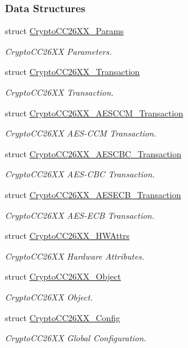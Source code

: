 \subsubsection*{Data Structures}
\begin{DoxyCompactItemize}
\item 
struct \hyperlink{struct_crypto_c_c26_x_x___params}{Crypto\+C\+C26\+X\+X\+\_\+\+Params}
\begin{DoxyCompactList}\small\item\em Crypto\+C\+C26\+X\+X Parameters. \end{DoxyCompactList}\item 
struct \hyperlink{struct_crypto_c_c26_x_x___transaction}{Crypto\+C\+C26\+X\+X\+\_\+\+Transaction}
\begin{DoxyCompactList}\small\item\em Crypto\+C\+C26\+X\+X Transaction. \end{DoxyCompactList}\item 
struct \hyperlink{struct_crypto_c_c26_x_x___a_e_s_c_c_m___transaction}{Crypto\+C\+C26\+X\+X\+\_\+\+A\+E\+S\+C\+C\+M\+\_\+\+Transaction}
\begin{DoxyCompactList}\small\item\em Crypto\+C\+C26\+X\+X A\+E\+S-\/\+C\+C\+M Transaction. \end{DoxyCompactList}\item 
struct \hyperlink{struct_crypto_c_c26_x_x___a_e_s_c_b_c___transaction}{Crypto\+C\+C26\+X\+X\+\_\+\+A\+E\+S\+C\+B\+C\+\_\+\+Transaction}
\begin{DoxyCompactList}\small\item\em Crypto\+C\+C26\+X\+X A\+E\+S-\/\+C\+B\+C Transaction. \end{DoxyCompactList}\item 
struct \hyperlink{struct_crypto_c_c26_x_x___a_e_s_e_c_b___transaction}{Crypto\+C\+C26\+X\+X\+\_\+\+A\+E\+S\+E\+C\+B\+\_\+\+Transaction}
\begin{DoxyCompactList}\small\item\em Crypto\+C\+C26\+X\+X A\+E\+S-\/\+E\+C\+B Transaction. \end{DoxyCompactList}\item 
struct \hyperlink{struct_crypto_c_c26_x_x___h_w_attrs}{Crypto\+C\+C26\+X\+X\+\_\+\+H\+W\+Attrs}
\begin{DoxyCompactList}\small\item\em Crypto\+C\+C26\+X\+X Hardware Attributes. \end{DoxyCompactList}\item 
struct \hyperlink{struct_crypto_c_c26_x_x___object}{Crypto\+C\+C26\+X\+X\+\_\+\+Object}
\begin{DoxyCompactList}\small\item\em Crypto\+C\+C26\+X\+X Object. \end{DoxyCompactList}\item 
struct \hyperlink{struct_crypto_c_c26_x_x___config}{Crypto\+C\+C26\+X\+X\+\_\+\+Config}
\begin{DoxyCompactList}\small\item\em Crypto\+C\+C26\+X\+X Global Configuration. \end{DoxyCompactList}\end{DoxyCompactItemize}
